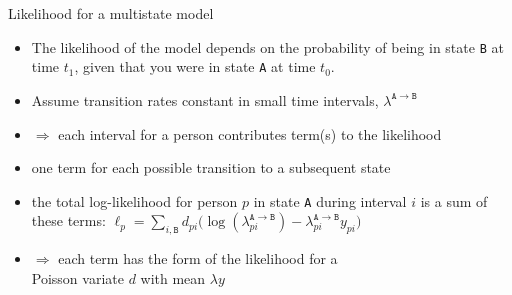 



\begin{frame}{Likelihood for a multistate model}
  \begin{itemize}
  \item The likelihood of the model depends on the probability of
    being in state \texttt{B} at time $t_1$, given that you were in
    state \texttt{A} at time $t_0$.
  \item Assume transition rates constant in small time intervals,
    $\lambda^{\mathtt{A}\rightarrow\mathtt{B}}$
  \item $\Rightarrow$ each interval for a person contributes term(s)
    to the likelihood
  \item one term for each possible transition to a subsequent state
  \item the total log-likelihood for person $p$ in state \texttt{A}
    during interval $i$ is a
    sum of these terms:
    \alert<6>{$\ell_p = \sum_{i,\mathtt{B}}d_{pi}\big(
      \log(\lambda^{\mathtt{A}\rightarrow\mathtt{B}}_{pi})-
           \lambda^{\mathtt{A}\rightarrow\mathtt{B}}_{pi}y_{pi}\big)$}
  \item $\Rightarrow$ each term has the form of the likelihood for a\\
    Poisson variate \alert<6>{$d$} with mean \alert<6>{$\lambda y$}
  \end{itemize}
\end{frame}

